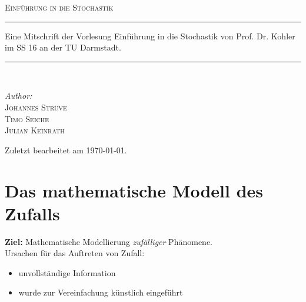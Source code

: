 \documentclass[a4paper,12pt,fleqn]{scrartcl}
\theoremstyle{definition}
\theoremstyle{plain}
\theoremstyle{remark}
\begin{document}
\setcounter{section}{3}
\begin{titlepage}
\begin{center}
\textsc{\LARGE Einführung in die Stochastik}\\[2.0cm]
\rule{\linewidth}{0.5mm}
Eine Mitschrift der Vorlesung Einführung in die Stochastik von Prof. Dr. Kohler im SS 16 an der TU Darmstadt.
\rule{\linewidth}{0.5mm}\\[2.0cm]
\begin{minipage}{0.4\textwidth}
\begin{flushleft}
\large \emph{Author:}\\\textsc{Johannes Struve\\Timo Seiche\\Julian Keinrath}\\[1.0cm]
\end{flushleft}
\end{minipage}
\vfill
Zuletzt bearbeitet am {\large \today}.
\end{center}
\end{titlepage}

\tableofcontents

\newpage

\section{Das mathematische Modell des Zufalls}
\textbf{Ziel:} Mathematische Modellierung \emph{zufälliger} Phänomene.\\
Ursachen für das Auftreten von Zufall:
\begin{itemize}
\item unvollständige Information
\item wurde zur Vereinfachung künstlich eingeführt
\end{itemize}
\end{document}
